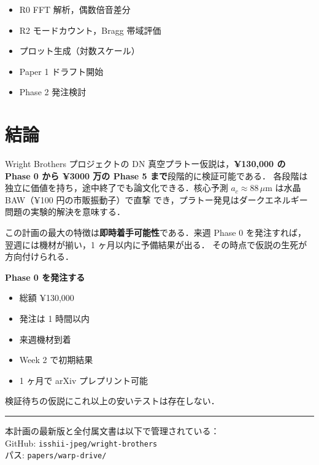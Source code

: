 \documentclass[11pt,a4paper]{article}
\begin{document}
\begin{itemize}
\item[$\square$] R0 FFT 解析，偶数倍音差分
\item[$\square$] R2 モードカウント，Bragg 帯域評価
\item[$\square$] プロット生成（対数スケール）
\item[$\square$] Paper 1 ドラフト開始
\item[$\square$] Phase 2 発注検討
\end{itemize}

\section{結論}

Wright Brothers プロジェクトの DN 真空プラトー仮説は，\textbf{¥130,000
の Phase 0 から ¥3000 万の Phase 5 まで}段階的に検証可能である．
各段階は独立に価値を持ち，途中終了でも論文化できる．核心予測
$a_c \approx 88\,\mu$m は水晶 BAW（¥100 円の市販振動子）で直撃
でき，プラトー発見はダークエネルギー問題の実験的解決を意味する．

この計画の最大の特徴は\textbf{即時着手可能性}である．来週 Phase 0
を発注すれば，翌週には機材が揃い，1 ヶ月以内に予備結果が出る．
その時点で仮説の生死が方向付けられる．

\begin{tcolorbox}[colback=green!5,colframe=green!60!black,title=今やるべき 1 つのこと]
\begin{center}
\Large
\textbf{Phase 0 を発注する}
\end{center}

\begin{itemize}
\item 総額 ¥130,000
\item 発注は 1 時間以内
\item 来週機材到着
\item Week 2 で初期結果
\item 1 ヶ月で arXiv プレプリント可能
\end{itemize}

検証待ちの仮説にこれ以上の安いテストは存在しない．
\end{tcolorbox}

\vspace{2em}
\hrule
\vspace{0.5em}
\small
\noindent
本計画の最新版と全付属文書は以下で管理されている：\\
GitHub: \texttt{isshii-jpeg/wright-brothers}\\
パス: \texttt{papers/warp-drive/}
\end{document}
